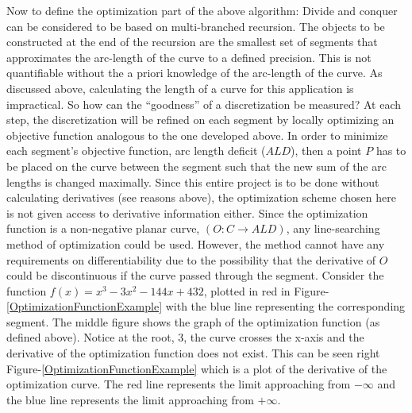 \documentclass[preprint,12pt]{elsarticle}
\begin{document}
Now to define the optimization part of the above algorithm:  Divide and conquer can be considered to be based on multi-branched recursion.  The objects to be constructed at the end of the recursion are the smallest set of segments that approximates the arc-length of the curve to a defined precision.  This is not quantifiable without the a priori knowledge of the arc-length of the curve.  As discussed above, calculating the length of a curve for this application is impractical.  So how can the ``goodness'' of a discretization be measured?  At each step, the discretization will be refined on each segment by locally optimizing an objective function analogous to the one developed above.  In order to minimize each segment’s objective function, arc length deficit ($ALD$), then a point $P$ has to be placed on the curve between the segment such that the new sum of the arc lengths is changed maximally.  Since this entire project is to be done without calculating derivatives (see reasons above), the optimization scheme chosen here is not given access to derivative information either.  Since the optimization function is a non-negative planar curve, $(O: C \rightarrow ALD)$, any line-searching method of optimization could be used.  However, the method cannot have any requirements on differentiability due to the possibility that the derivative of $O$ could be discontinuous if the curve passed through the segment.  Consider the function $f(x)=x^3-3x^2-144x+432$, plotted in red in Figure-\ref{OptimizationFunctionExample} with the blue line representing the corresponding segment.  The middle figure shows the graph of the optimization function (as defined above).  Notice at the root, 3, the curve crosses the x-axis and the derivative of the optimization function does not exist.  This can be seen right Figure-\ref{OptimizationFunctionExample} which is a plot of the derivative of the optimization curve.  The red line represents the limit approaching from $-\infty$ and the blue line represents the limit approaching from $+\infty$.
\end{document}
